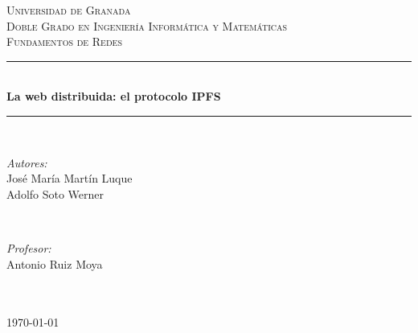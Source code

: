 \documentclass[12pt]{article} %
\begin{document}

\begin{titlepage}
\sffamily

\newcommand{\HRule}{\rule{\linewidth}{0.5mm}} %

\center %

\textsc{\LARGE Universidad de Granada}\\[1.5cm] %
\textsc{\Large Doble Grado en Ingeniería Informática y Matemáticas}\\[0.5cm] %
\textsc{\large Fundamentos de Redes}\\[0.5cm] %

\HRule \\[1cm]
{ \huge \bfseries La web distribuida: el protocolo IPFS}\\[0.4cm] %
\HRule \\[1.5cm]

\begin{minipage}{0.4\textwidth}
\begin{flushleft} \large
\emph{Autores:}\\
José María Martín Luque\\
Adolfo Soto Werner %
\end{flushleft}
\end{minipage}
~
\begin{minipage}{0.4\textwidth}
\begin{flushright} \large
\emph{Profesor:} \\
Antonio Ruiz Moya\\ %
\hfill\\
\end{flushright}
\end{minipage}\\[4cm]

{\large \today}\\[3cm] %


\vfill %

\end{titlepage}
\end{document}
